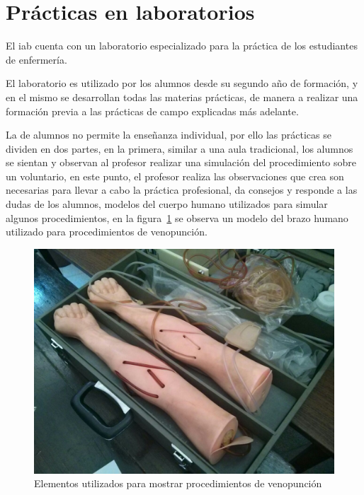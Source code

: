 \section{Prácticas en laboratorios}
\label{sec:practica_lab}

El \Gls{iab} cuenta con un laboratorio especializado para la práctica de los
estudiantes de enfermería.

El laboratorio es utilizado por los alumnos desde su segundo año de formación, y
en el mismo se desarrollan todas las materias prácticas, de manera a realizar
una formación previa a las prácticas de campo explicadas más adelante.

La  de alumnos no permite  la enseñanza individual, por ello las prácticas se
dividen en dos partes, en la primera, similar a una aula tradicional, los
alumnos se sientan y observan al profesor realizar una simulación del
procedimiento sobre un voluntario, en este punto, el profesor realiza las
observaciones que crea son necesarias para llevar a cabo la práctica
profesional, da consejos y responde a las dudas de los alumnos,
 modelos del cuerpo humano utilizados para simular
algunos procedimientos, en la figura~\ref{fig:iab_veno} se observa un modelo del
brazo humano utilizado para procedimientos de venopunción.

\begin{figure}[h!t] 
\centering 
\includegraphics[scale=0.2,natwidth=100,natheight=100]{problema/iab_sala_2.jpg}
\caption{Elementos utilizados para mostrar procedimientos de venopunción}
\label{fig:iab_veno}
\end{figure}

